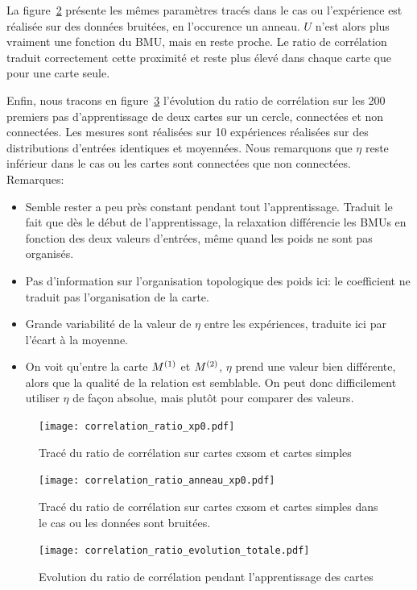 \documentclass[../main]{subfiles}
\begin{document}
La figure~\ref{fig:cr_bruit} présente les mêmes paramètres tracés dans le cas ou l'expérience est réalisée sur des données bruitées, en l'occurence un anneau. $U$ n'est alors plus vraiment une fonction du BMU, mais en reste proche. 
Le ratio de corrélation traduit correctement cette proximité et reste plus élevé dans chaque carte que pour une carte seule.

Enfin, nous tracons en figure~\ref{fig:cr_evol} l'évolution du ratio de corrélation sur les 200 premiers pas d'apprentissage de deux cartes sur un cercle, connectées et non connectées. Les mesures sont réalisées sur 10 expériences réalisées sur des distributions d'entrées identiques et moyennées.
Nous remarquons que $\eta$ reste inférieur dans le cas ou les cartes sont connectées que non connectées. 
Remarques:
\begin{itemize}
    \item Semble rester a peu près constant pendant tout l'apprentissage. Traduit le fait que dès le début de l'apprentissage, la relaxation différencie les BMUs en fonction des deux valeurs d'entrées, même quand les poids ne sont pas organisés.
    \item Pas d'information sur l'organisation topologique des poids ici: le coefficient ne traduit pas l'organisation de la carte.
    \item Grande variabilité de la valeur de $\eta$ entre les expériences, traduite ici par l'écart à la moyenne.
    \item On voit qu'entre la carte $M^{({1})}$ et $M^{({2})}$, $\eta$ prend une valeur bien différente, alors que la qualité de la relation est semblable. On peut donc difficilement utiliser $\eta$ de façon absolue, mais plutôt pour comparer des valeurs.
\end{itemize}

\begin{figure}
    \texttt{[image: correlation\_ratio\_xp0.pdf]}
    \caption{Tracé du ratio de corrélation sur cartes cxsom et cartes simples \label{fig:cr_xp}}
\end{figure}

\begin{figure}
    \texttt{[image: correlation\_ratio\_anneau\_xp0.pdf]}
    \caption{Tracé du ratio de corrélation sur cartes cxsom et cartes simples dans le cas ou les données sont bruitées.\label{fig:cr_bruit}}
\end{figure}

\begin{figure}
    \texttt{[image: correlation\_ratio\_evolution\_totale.pdf]}
    \caption{Evolution du ratio de corrélation pendant l'apprentissage des cartes\label{fig:cr_evol}}
\end{figure}
\end{document}
